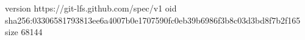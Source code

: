 version https://git-lfs.github.com/spec/v1
oid sha256:03306581793813ee6a4007b0e1707590fc0eb39b6986f3b8c03d3bd8f7b2f165
size 68144
